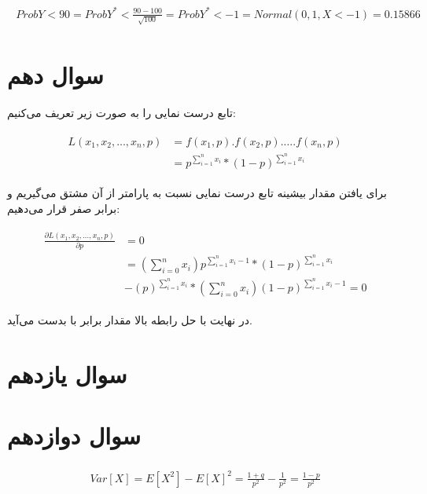 \documentclass[paper=a4, fontsize=11pt]{article}
\numberwithin{equation}{section} %
\numberwithin{figure}{section} %
\numberwithin{table}{section} %
\begin{document}
\begin{align}
\begin{split}
    Prob{Y < 90} = Prob{Y^* < \frac{90 - 100}{\sqrt{100}}} = Prob{Y^* < -1} = Normal(0, 1, X < -1) = 0.15866
\end{split}
\end{align}

\section{سوال دهم}
تابع درست نمایی را به صورت زیر تعریف می‌کنیم:

\begin{align}
\begin{split}
    L(x_1, x_2, \ldots, x_n, p) &= f(x_1, p) . f(x_2, p) . \ldots . f(x_n, p)\\
    &= p^{\sum_{i=1}^{n} x_i} * (1-p)^{\sum_{i=1}^{n} x_i}
\end{split}
\end{align}

برای یافتن مقدار بیشینه تابع درست نمایی نسبت به پارامتر 
از آن مشتق می‌گیریم و برابر صفر قرار می‌دهیم:

\begin{align}
\begin{split}
    \frac{\partial L(x_1, x_2, \ldots, x_n, p)}{\partial p} &= 0\\
    &= (\sum_{i=0}^{n} x_i) p^{\sum_{i=1}^{n} x_i - 1} * (1-p)^{\sum_{i=1}^{n} x_i}\\
    &- (p)^{\sum_{i=1}^{n} x_i} * (\sum_{i=0}^{n} x_i) (1-p)^{\sum_{i=1}^{n} x_i - 1} = 0
\end{split}
\end{align}

در نهایت با حل رابطه بالا مقدار  برابر با 
بدست می‌آید.

\section{سوال یازدهم}

\section{سوال دوازدهم}
\begin{align}
\begin{split}
    Var[X] = E[X^2] - E[X]^2 = \frac{1+q}{p^2} - \frac{1}{p^2} = \frac{1-p}{p^2}
\end{split}
\end{align}
\end{document}
